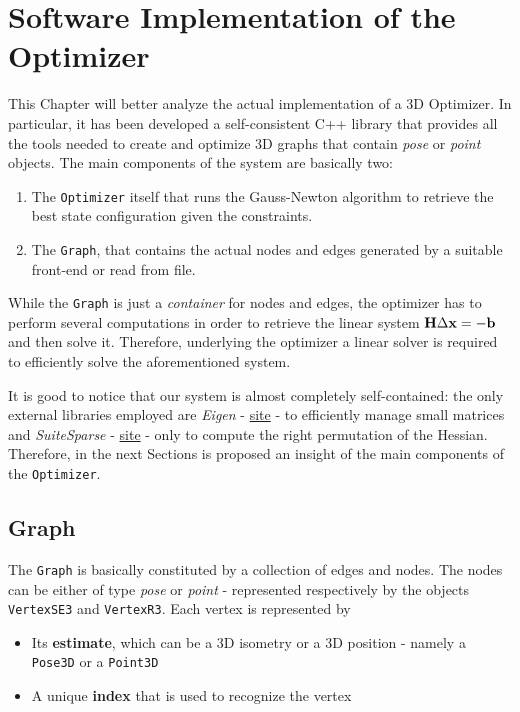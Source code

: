 \chapter{Software Implementation of the Optimizer}\label{ch:implementation}
This Chapter will better analyze the actual implementation of a 3D Optimizer. In particular, it has been developed a self-consistent C++ library that provides all the tools needed to create and optimize 3D graphs that contain \textit{pose} or \textit{point} objects. The main components of the system are basically two:

\begin{enumerate}
    \item The \texttt{Optimizer} itself that runs the Gauss-Newton algorithm to retrieve the best state configuration given the constraints.
    \item The \texttt{Graph}, that contains the actual nodes and edges generated by a suitable front-end or read from file.
\end{enumerate}

While the \texttt{Graph} is just a \textit{container} for nodes and edges, the optimizer has to perform several computations in order to retrieve the linear system $\mathbf{H} \Delta \mathbf{x} = -\mathbf{b}$ and then solve it. Therefore, underlying the optimizer a linear solver is required to efficiently solve the aforementioned system. 

It is good to notice that our system is almost completely self-contained: the only external libraries employed are \textit{Eigen} - \hyperref{http://eigen.tuxfamily.org}{}{}{site} -  to efficiently manage small matrices  and \textit{SuiteSparse}  - \hyperref{http://faculty.cse.tamu.edu/davis/suitesparse.html}{}{}{site} - only to compute the right permutation of the Hessian. Therefore, in the next Sections is proposed an insight of the main components of the \texttt{Optimizer}.

\section{Graph}\label{sec:graph_implementation}
The \texttt{Graph} is basically constituted by a collection of edges and nodes. The nodes can be either of type \textit{pose} or \textit{point} - represented respectively by the objects \texttt{VertexSE3} and \texttt{VertexR3}. Each vertex is represented by

\begin{itemize}
    \item Its \textbf{estimate}, which can be a 3D isometry or a 3D position - namely a \texttt{Pose3D} or a \texttt{Point3D}
    \item A unique \textbf{index} that is used to recognize the vertex
\end{itemize}

